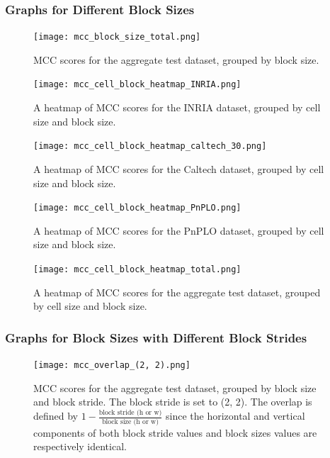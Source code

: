 \subsubsection{Graphs for Different Block Sizes}

\begin{figure}
    \centering
    \texttt{[image: mcc\_block\_size\_total.png]}
    \caption{
        MCC scores for the aggregate test dataset, grouped by block size.
    }
    \label{fig:block_size_total}
\end{figure}


\begin{figure}
    \centering
    \texttt{[image: mcc\_cell\_block\_heatmap\_INRIA.png]}
    \caption{
        A heatmap of MCC scores for the INRIA dataset, grouped by cell size and block size.
    }
    \label{fig:cell_block_heatmap_inria}
\end{figure}

\begin{figure}
    \centering
    \texttt{[image: mcc\_cell\_block\_heatmap\_caltech\_30.png]}
    \caption{
        A heatmap of MCC scores for the Caltech dataset, grouped by cell size and block size.
    }
    \label{fig:cell_block_heatmap_caltech}
\end{figure}

\begin{figure}
    \centering
    \texttt{[image: mcc\_cell\_block\_heatmap\_PnPLO.png]}
    \caption{
        A heatmap of MCC scores for the PnPLO dataset, grouped by cell size and block size.
    }
\end{figure}

\begin{figure}
    \centering
    \texttt{[image: mcc\_cell\_block\_heatmap\_total.png]}
    \caption{
        A heatmap of MCC scores for the aggregate test dataset, grouped by cell size and block size.
    }
    \label{fig:cell_block_heatmap_total}
\end{figure}

\subsubsection{Graphs for Block Sizes with Different Block Strides}

\begin{figure}
    \centering
    \texttt{[image: mcc\_overlap\_(2, 2).png]}
    \caption{
        MCC scores for the aggregate test dataset, grouped by block size and block stride. The block stride is set to (2, 2). The overlap is defined by $1 - \frac{\text{block stride (h or w)}}{\text{block size (h or w)}}$ since the horizontal and vertical components of both block stride values and block sizes values are respectively identical.
    }
    \label{fig:overlap_2_2}
\end{figure}

